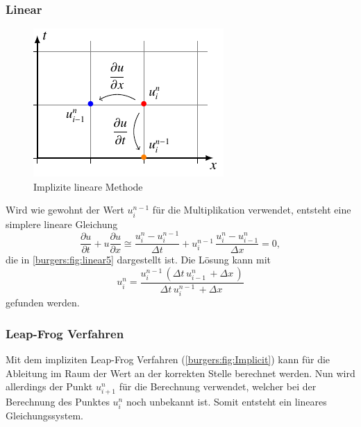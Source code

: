 	\subsubsection{Linear}
	\label{burgers:sec:imp_lin}
	     \begin{figure}
		\centering
		\includegraphics[height=.4\textwidth]{papers/burgers/BurgersEquation/tikz/linear5/linear5.pdf}
		\caption{Implizite lineare Methode}
		\label{burgers:fig:linear5}
		\end{figure}

		Wird wie gewohnt der Wert  $u_{i}^{n-1}$ f\"ur die Multiplikation verwendet, entsteht eine simplere lineare Gleichung
	    \begin{equation}
		\frac {\partial u}{\partial t}+u{\frac {\partial u}{\partial x}} \cong \frac{u_{i}^{n}-u_{i}^{n-1}}{\Delta t}+ u_{i}^{n-1}\, \frac{u_{i}^{n}-u_{i-1}^{n}}{\Delta x}=0,
		\label{burgers:eq:imp_lin}
		\end{equation}
		die in \autoref{burgers:fig:linear5} dargestellt ist.
	    Die L\"osung kann mit
	    \begin{equation}
		 u_{i}^{n} = \frac{u^{n-1}_{i}\, \left(\Delta{t}\, u^{n}_{i-1}\, + \Delta{x}\,\right)}{\Delta{t}\, u^{n-1}_{i}\, + \Delta{x}\,}
		 \label{burgers:eq:imp_lin_sol}
		\end{equation}
	    gefunden werden.

	\subsubsection{Leap-Frog Verfahren}

		Mit dem impliziten Leap-Frog Verfahren (\autoref{burgers:fig:Implicit}) kann f\"ur die Ableitung im Raum der Wert an der korrekten Stelle berechnet werden.
		Nun wird allerdings der Punkt  $u_{i+1}^{n}$ f\"ur die Berechnung verwendet, welcher bei der Berechnung des Punktes  $u_{i}^{n}$ noch unbekannt ist.
		Somit entsteht ein lineares Gleichungssystem.

